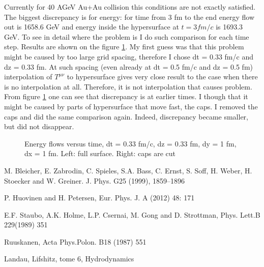 \documentclass[12pt,a4paper]{report}
\begin{document}
Currently for 40 AGeV Au+Au collision this conditions are not exactly satisfied. The biggest discrepancy is for energy: for time from 3 fm to the end energy flow out is 1658.6 GeV and energy inside the hypersurface at $t = 3 fm/c$ is 1693.3 GeV. To see in detail where the problem is I do such comparison for each time step. Results are shown on the figure \ref{fig:Econsdt03dz03}. My first guess was that this problem might be caused by too large grid spacing, therefore I chose dt = 0.33 fm/c and dz = 0.33 fm. At such spacing (even already at dt = 0.5 fm/c and dz = 0.5 fm) interpolation of $T^{\mu\nu}$ to hypersurface gives very close result to the case when there is no interpolation at all. Therefore, it is not interpolation that causes problem. From figure \ref{fig:Econsdt03dz03} one can see that discrepancy is at earlier times. I though that it might be caused by parts of hypersurface that move fast, the caps. I removed the caps and did the same comparison again. Indeed, discrepancy became smaller, but did not disappear.


\begin{figure}

\begin{minipage}[h]{0.49\linewidth}
\end{minipage}
\hfill
\begin{minipage}[h]{0.49\linewidth}
\end{minipage}

\caption{Energy flows versus time, dt = 0.33 fm/c, dz = 0.33 fm, dy = 1 fm, dx = 1 fm. Left: full surface. Right: caps are cut}
\label{fig:Econsdt03dz03}
\end{figure}



\begin{thebibliography}{99}

M. Bleicher, E. Zabrodin, C. Spieles, S.A. Bass, C. Ernst, S. Soff, H. Weber, H. Stoecker and
W. Greiner. J. Phys. G25 (1999), 1859–1896

 P. Huovinen and H. Petersen,  Eur. Phys. J. A (2012) 48: 171

%
E.F. Staubo, A.K. Holme, L.P. Csernai, M. Gong and D. Strottman, Phys. Lett.B 229(1989) 351

Ruuskanen, Acta Phys.Polon. B18 (1987) 551

%
Landau, Lifshitz, tome 6, Hydrodynamics



\end{thebibliography}
\end{document}
